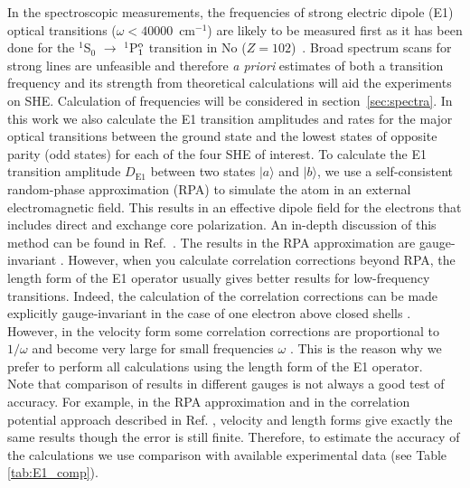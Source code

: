 \documentclass[10pt,a4paper, twoside, openright]{report}
\begin{document}
In the spectroscopic measurements, the frequencies of strong electric dipole (E1) optical transitions ($\omega < 40 000$~cm$^{-1}$) are likely to be measured first as it has been done for the $^1$S$_0$ $\rightarrow$ $^1$P$_1^{\rm o}$ transition in No ($Z=102$)~\cite{Laatiaoui2016}. Broad spectrum scans for strong lines are unfeasible and therefore \textit{a priori} estimates of both a transition frequency and its strength from theoretical calculations will aid the experiments on SHE. Calculation of frequencies will be considered in section~\ref{sec:spectra}. In this work we also calculate the E1 transition amplitudes and rates for the major optical  transitions between the ground state and the  lowest states of opposite parity (odd states) for each of the four SHE of interest. 
\linebreak
To calculate the E1 transition amplitude $D_{\text{E1}}$ between two states $|a\rangle$ and $|b\rangle$, we use a self-consistent random-phase approximation (RPA) to simulate the atom in an external electromagnetic field. This results in an effective dipole field for the electrons that includes direct and exchange core polarization. An in-depth discussion of this method can be found in Ref.~\cite{DFSS1986, Dzuba2018}. The results in the  RPA approximation are gauge-invariant \cite{DFSS1986}. However, when you calculate correlation corrections beyond RPA, the length form of the E1 operator usually gives better results for low-frequency transitions. Indeed, the calculation of the correlation corrections can be made explicitly gauge-invariant in the case of one electron above closed shells \cite{DFSS1987_2, DFSS1987}. However, in the velocity form some correlation corrections are proportional to $1/\omega$ and become very large for small frequencies $\omega$  \cite{DFSS1987_2, DFSS1987}. This is the reason why we prefer to perform all calculations using the length form of the E1 operator. \\

Note that comparison of results in different gauges is not always a good test of accuracy. For example, in the RPA approximation and in the correlation potential approach described in Ref. \cite{DFSS1987_2, DFSS1987}, velocity and length forms give exactly the same results though the error is still finite. Therefore, to estimate the accuracy of the calculations we use comparison with available experimental data (see Table \ref{tab:E1_comp}).\\
\end{document}
